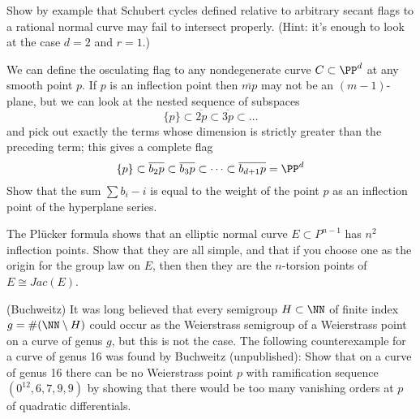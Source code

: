 \begin{exercise}\label{only general secants}
Show by example that Schubert cycles defined relative to arbitrary secant flags to a rational normal curve may fail to intersect properly. (Hint: it's enough to look at the case $d=2$ and $r=1$.)
\end{exercise}

\begin{exercise}
We can define the osculating flag to any nondegenerate curve $C \subset \PP^d$ at any smooth point $p$. If $p$ is an inflection point then $\overline{mp}$ may not be an $(m-1)$-plane, but we can look at the nested sequence of subspaces
$$
\{p\} \subset \overline{2p} \subset \overline{3p} \subset \dots 
$$
and pick out exactly the terms whose dimension is strictly greater than the preceding term; this gives a complete flag
$$
\{p\} \subset \overline{b_2p} \subset \overline{b_3p} \subset \dots \subset \overline{b_{d+1}p} = \PP^d
$$
Show that the sum $\sum b_i - i$ is equal to the weight of the point $p$ as an inflection point of the hyperplane series.
\end{exercise}


\begin{exercise}
The Pl\"ucker formula shows that an elliptic normal curve $E\subset P^{n-1}$ has $n^2$ inflection points. Show that they are
all simple, and that if you choose one as the origin for the group law on $E$, then 
then they are the $n$-torsion points of  $E \cong Jac(E)$.
\end{exercise}

\begin{exercise}(Buchweitz)
It was long believed that every semigroup $H \subset \NN$ of finite index $g = \#(\NN \setminus H)$ could occur as the Weierstrass semigroup of a Weierstrass
point on a curve of genus $g$, but this is not the case. The following counterexample for a curve of genus 16 was found by Buchweitz (unpublished): Show that on a curve of genus 16 there can be no Weierstrass point $p$ with ramification sequence
$(0^{12}, 6,7,9,9)$ by showing that there would be too many vanishing orders at $p$ of quadratic differentials.
 \end{exercise}

